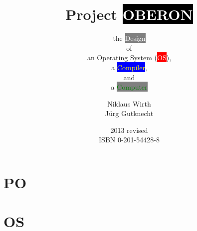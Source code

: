 \documentclass[a5paper,footinclude=true,headinclude=true]{scrbook}
\begin{document}
\title{Project \colorbox{black}{\textcolor{white}{OBERON}}}
\subtitle{ the \colorbox{gray}{\textcolor{white}{Design}}\\of\\an Operating System
              (\colorbox{red}{\textcolor{white}{OS}}),\\a
               \colorbox{blue}{\textcolor{yellow}{Compiler}},\\and\\a
               \colorbox{gray}{\textcolor{green}{Computer}}}
\author{Niklaus Wirth\\Jürg Gutknecht}
\date{2013 revised\\ISBN 0-201-54428-8}
\maketitle
\part*{PO}


\part{OS}























%
%
%
%
%
%
%
%
%
%
\end{document}

